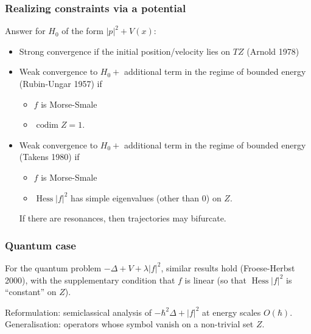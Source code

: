 \documentclass[mathserif]{beamer}
\begin{document}
    \begin{frame}
      \frametitle{Realizing constraints via a potential}
      Answer for $H_0$ of the form $|p|^2+V(x)$:
      \begin{itemize}
        \item Strong convergence if the initial position/velocity lies on $TZ$
          (Arnold 1978)
          \item<2-> Weak convergence to $H_0+$ additional term in the
            regime of bounded energy (Rubin-Ungar 1957) if
            \begin{itemize}
            \item $f$ is Morse-Smale
            \item $\mathop{codim} Z=1$.
            \end{itemize}
          \item<3-> Weak convergence to $H_0+$ additional term in the
            regime of bounded energy (Takens 1980) if
            \begin{itemize}
            \item $f$ is Morse-Smale
            \item $\mathop{Hess} |f|^2$ has simple eigenvalues (other than $0$) on $Z$.
            \end{itemize}
            If there are resonances, then trajectories may bifurcate.
          \end{itemize}
        \end{frame}

        \begin{frame}
          \frametitle{Quantum case}
          For the quantum problem $-\Delta+V+\lambda |f|^2$, similar
          results hold (Froese-Herbst 2000), with the supplementary
          condition that $f$ is linear (so that $\mathop{Hess} |f|^2$
          is ``constant'' on $Z$).

          \vfill

          Reformulation: semiclassical analysis of
          $-\hbar^2\Delta+|f|^2$ at energy scales
          $O(\hbar)$. Generalisation: operators whose symbol vanish on
          a non-trivial set $Z$.
        \end{frame}
\end{document}

